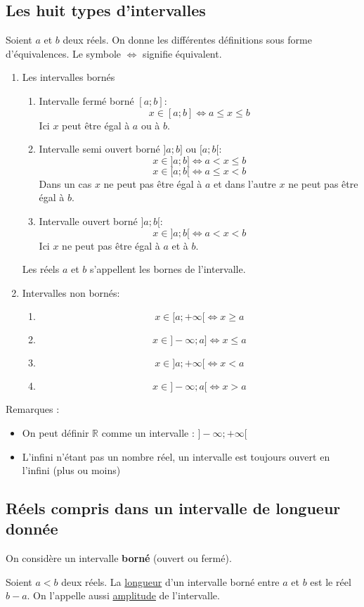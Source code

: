 \documentclass[10pt,a4paper]{book}
\newcommand{\R}{\mathbb{R}}
\begin{document}
  \subsection*{Les huit types d'intervalles}
  Soient $a$ et $b$ deux réels. On donne les différentes définitions sous forme 
  d'équivalences. Le symbole $\Longleftrightarrow$ signifie équivalent. 
  \begin{enumerate}
    \item Les intervalles bornés
    \begin{enumerate}
      \item Intervalle fermé borné $[a;b]$: 
      $$x\in[a;b]\Longleftrightarrow a\leq x\leq b$$
      Ici $x$ peut être égal à $a$ ou à $b$.
      \item Intervalle semi ouvert borné $]a;b]$ ou $[a;b[$: 
      $$x\in]a;b]\Longleftrightarrow a<x\leq b$$
      $$x\in[a;b[\Longleftrightarrow a\leq x< b$$
      Dans un cas $x$ ne peut pas être égal à $a$ et dans l'autre $x$ ne peut 
      pas être égal à $b$. 
       \item Intervalle ouvert borné $]a;b[$: 
      $$x\in]a;b[\Longleftrightarrow a< x< b$$
      Ici $x$ ne peut pas être égal à $a$ et à $b$.
    \end{enumerate}
    \begin{de}
      Les réels $a$ et $b$ s'appellent les bornes de l'intervalle.
    \end{de}
    \item Intervalles non bornés:
    \begin{enumerate}
      \item $$x\in[a;+\infty[\Longleftrightarrow x\geq a$$
      \item $$x\in]-\infty;a]\Longleftrightarrow x\leq a$$
      \item $$x\in]a;+\infty[\Longleftrightarrow x<a$$
      \item $$x\in]-\infty;a[\Longleftrightarrow x> a$$
    \end{enumerate}
  \end{enumerate}
   Remarques : \begin{itemize}
      \item On peut définir $\R$ comme un intervalle :  $]-\infty;+\infty[$
      \item L'infini n'étant pas un nombre réel, un intervalle est toujours ouvert en l'infini (plus ou moins)
  \end{itemize}
  
  
  \subsection*{Réels compris dans un intervalle de longueur donnée}
  On considère un intervalle \textbf{borné} (ouvert ou fermé). 
  \begin{de}
    Soient $a<b$ deux réels. La \underline{longueur} d'un intervalle borné entre $a$ et $b$ 
    est le réel $b-a$. On l'appelle aussi \underline{amplitude} de l'intervalle.
  \end{de}
\end{document}
